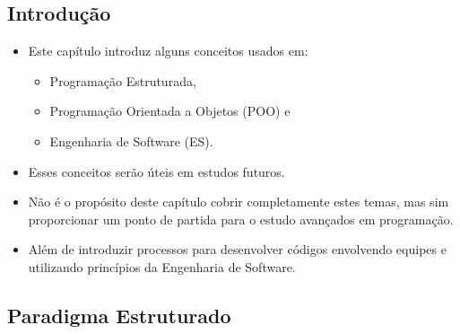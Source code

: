 \documentclass[12pt,a4paper]{article}
\providecommand{\tightlist}{%
      \setlength{\itemsep}{0pt}\setlength{\parskip}{0pt}}
\begin{document}
    \hypertarget{introduuxe7uxe3o}{%
\subsection{Introdução}\label{introduuxe7uxe3o}}

    \begin{itemize}
\tightlist
\item
  Este capítulo introduz alguns conceitos usados em:

  \begin{itemize}
  \tightlist
  \item
    Programação Estruturada,
  \item
    Programação Orientada a Objetos (POO) e
  \item
    Engenharia de Software (ES).
  \end{itemize}
\item
  Esses conceitos serão úteis em estudos futuros.
\item
  Não é o propósito deste capítulo cobrir completamente estes temas, mas
  sim proporcionar um ponto de partida para o estudo avançados em
  programação.
\item
  Além de introduzir processos para desenvolver códigos envolvendo
  equipes e utilizando princípios da Engenharia de Software.
\end{itemize}

    \hypertarget{paradigma-estruturado}{%
\subsection{Paradigma Estruturado}\label{paradigma-estruturado}}
\end{document}

